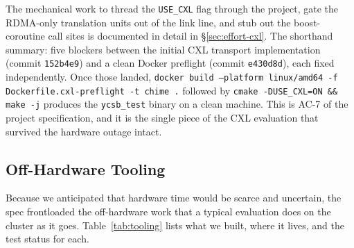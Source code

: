 \documentclass[11pt,a4paper]{article}
\begin{document}
The mechanical work to thread the \texttt{USE\_CXL} flag through the project, gate the RDMA-only translation units out of the link line, and stub out the boost-coroutine call sites is documented in detail in §\ref{sec:effort-cxl}. The shorthand summary: five blockers between the initial CXL transport implementation (commit \texttt{152b4e9}) and a clean Docker preflight (commit \texttt{e430d8d}), each fixed independently. Once those landed, \texttt{docker build --platform linux/amd64 -f Dockerfile.cxl-preflight -t chime .} followed by \texttt{cmake -DUSE\_CXL=ON \&\& make -j} produces the \texttt{ycsb\_test} binary on a clean machine. This is AC-7 of the project specification, and it is the single piece of the CXL evaluation that survived the hardware outage intact.

\subsection{Off-Hardware Tooling}
\label{sec:cxl-tooling}

Because we anticipated that hardware time would be scarce and uncertain, the spec frontloaded the off-hardware work that a typical evaluation does on the cluster as it goes. Table~\ref{tab:tooling} lists what we built, where it lives, and the test status for each.

\begin{table}[H]
\centering
\scriptsize
\caption{Off-hardware tooling for the CXL evaluation. Every item is committed to \texttt{main} and exercised by unit tests where applicable. Total: 18 unit tests passing.}
\label{tab:tooling}
\end{table}
\end{document}
